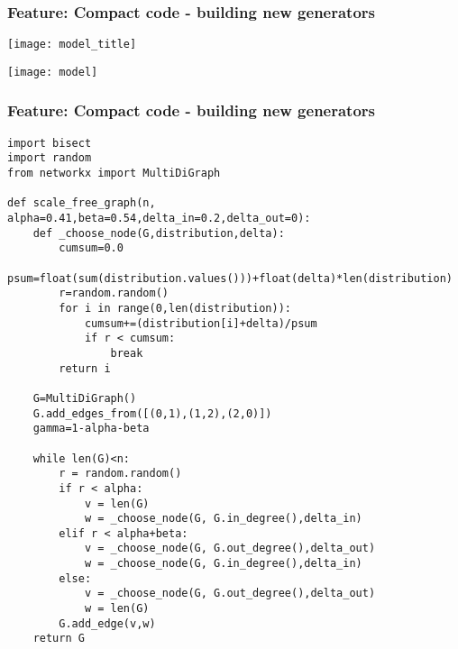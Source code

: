 \documentclass[xcolor=dvipsnames, 9pt]{beamer}
\begin{document}



\begin{frame}[fragile]
\frametitle{Feature: Compact code - building new generators}
\centerline{\texttt{[image: model\_title]}}
\centerline{\texttt{[image: model]}}
\end{frame}


\begin{frame}[fragile]
\frametitle{Feature: Compact code - building new generators}
\begin{block}{}
\tiny
\begin{lstlisting}
import bisect
import random
from networkx import MultiDiGraph

def scale_free_graph(n, alpha=0.41,beta=0.54,delta_in=0.2,delta_out=0):
    def _choose_node(G,distribution,delta):
        cumsum=0.0
        psum=float(sum(distribution.values()))+float(delta)*len(distribution)
        r=random.random()
        for i in range(0,len(distribution)):
            cumsum+=(distribution[i]+delta)/psum
            if r < cumsum:  
                break
        return i

    G=MultiDiGraph()
    G.add_edges_from([(0,1),(1,2),(2,0)])
    gamma=1-alpha-beta

    while len(G)<n:
        r = random.random()
        if r < alpha:
            v = len(G) 
            w = _choose_node(G, G.in_degree(),delta_in)
        elif r < alpha+beta:
            v = _choose_node(G, G.out_degree(),delta_out)
            w = _choose_node(G, G.in_degree(),delta_in)
        else:
            v = _choose_node(G, G.out_degree(),delta_out)
            w = len(G) 
        G.add_edge(v,w)
    return G

\end{lstlisting}
\end{block}
\end{frame}
\end{document}
